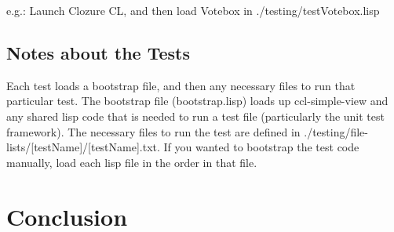 \documentclass[12pt]{article} %
\begin{document}
e.g.: Launch Clozure CL, and then load Votebox in ./testing/testVotebox.lisp

\subsection{Notes about the Tests}

	Each test loads a bootstrap file, and then any necessary files to run that particular test.
		The bootstrap file (bootstrap.lisp) loads up ccl-simple-view and any shared lisp code that is needed to run a test file (particularly the unit test framework). 
		The necessary files to run the test are defined in ./testing/file-lists/[testName]/[testName].txt. If you wanted to bootstrap the test code manually, load each lisp file in the order in that file.












\section{Conclusion} %

\lipsum[12-13]
\end{document}
